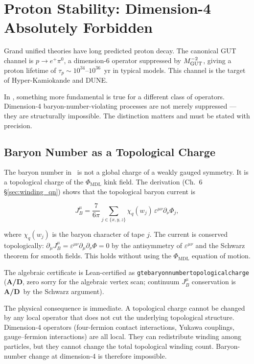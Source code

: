 \documentclass[11pt,openany]{book}
\theoremstyle{remark}
\newcommand{\GTE}{\text{GTE}}
\newcommand{\MDL}{\text{MDL}}
\newcommand{\lean}[1]{%
  \penalty-100
  \begingroup\def\_{\textunderscore\allowbreak}\texttt{#1}\endgroup}
\newcommand{\CatAD}{\textbf{A/D}}
\begin{document}
\section{Proton Stability: Dimension-4 Absolutely Forbidden}
\label{sec:proton_stability}

Grand unified theories have long predicted proton decay.  The canonical GUT channel is
$p \to e^+ \pi^0$, a dimension-6 operator suppressed by $M_{\rm GUT}^{-2}$, giving a
proton lifetime of $\tau_p \sim 10^{34}$--$10^{36}$~yr in typical models.  This channel
is the target of Hyper-Kamiokande and DUNE.

In \GTE, something more fundamental is true for a different class of operators.
Dimension-4 baryon-number-violating processes are not merely suppressed --- they are
structurally impossible.  The distinction matters and must be stated with precision.

\subsection*{Baryon Number as a Topological Charge}

The baryon number in \GTE\ is not a global charge of a weakly gauged symmetry.  It is
a topological charge of the $\Phi_\MDL$ kink field.  The derivation (Ch.~6
\S\ref{sec:winding_qn}) shows that the topological baryon current is

\begin{equation}
J^\mu_B = \frac{7}{6\pi} \sum_{j \in \{x,y,z\}} \chi_q(w_j)\, \varepsilon^{\mu\nu} \partial_\nu \Phi_j,
\end{equation}

where $\chi_q(w_j)$ is the baryon character of tape $j$.  The current is conserved
topologically: $\partial_\mu J^\mu_B = \varepsilon^{\mu\nu}\partial_\mu\partial_\nu \Phi = 0$
by the antisymmetry of $\varepsilon^{\mu\nu}$ and the Schwarz theorem for smooth fields.
This holds without using the $\Phi_\MDL$ equation of motion.

The algebraic certificate is Lean-certified as
\lean{gte\_baryon\_number\_topological\_charge} (\CatAD, zero sorry for the algebraic
vertex scan; continuum $J^\mu_B$ conservation is \CatAD\ by the Schwarz argument).

The physical consequence is immediate.  A topological charge cannot be changed by any
local operator that does not cut the underlying topological structure.  Dimension-4
operators (four-fermion contact interactions, Yukawa couplings, gauge--fermion
interactions) are all local.  They can redistribute winding among particles, but they
cannot change the total topological winding count.  Baryon-number change at
dimension-4 is therefore impossible.
\end{document}
